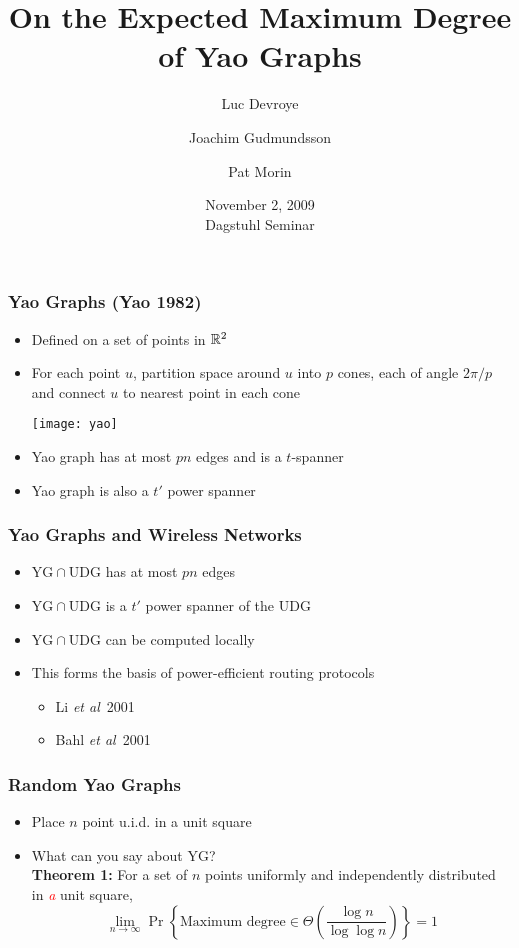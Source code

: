 \documentclass{beamer}
\title{On the Expected Maximum Degree \\ 
	of Yao Graphs}
\author{Luc Devroye 
	\and Joachim Gudmundsson
	\and Pat Morin}
\date{November 2, 2009 \\ Dagstuhl Seminar}
\renewcommand{\emph}[1]{\textcolor{red}{\it #1}}
\newcommand{\YG}{\mathrm{YG}}
\newcommand{\RDG}{\mathrm{UDG}}
\renewcommand{\etal}{\textit{et al}}
\begin{document}
\frame{\titlepage}



\frame
{
  \frametitle{Yao Graphs (Yao 1982)}
  \begin{itemize}
    \item Defined on a set of points in $\mathbb{R}^2$
    \item For each point $u$, partition space around $u$ into $p$ cones,
           each of angle $2\pi/p$ and connect $u$ to nearest point in each cone
    \begin{center}
      \texttt{[image: yao]}
    \end{center}
    \item Yao graph has at most $pn$ edges and is a $t$-spanner
    \item Yao graph is also a $t'$ power spanner
  \end{itemize}
}

\frame
{
  \frametitle{Yao Graphs and Wireless Networks}
  \begin{itemize}
    \item $\YG\cap\RDG$ has at most $pn$ edges
    \item $\YG\cap\RDG$ is a $t'$ power spanner of the $\RDG$
    \item $\YG\cap\RDG$ can be computed locally
    \item This forms the basis of power-efficient routing protocols
    \begin{itemize}
          \item Li \etal\ 2001
          \item Bahl \etal\ 2001
    \end{itemize}
  \end{itemize}
}

\frame
{
  \frametitle{Random Yao Graphs}
  \begin{itemize}
    \item Place $n$ point u.i.d. in a unit square
    \item What can you say about $\YG$? \\
          \textbf{Theorem 1:}
           For a set of $n$ points uniformly and independently distributed
		in \emph{a} unit square,
           \[\lim_{n\rightarrow\infty}
              \Pr\left\{\mbox{Maximum degree} \in \Theta\left(\frac{\log
n}{\log\log n}\right)\right\} = 1 \]
  \end{itemize}
}
\end{document}
